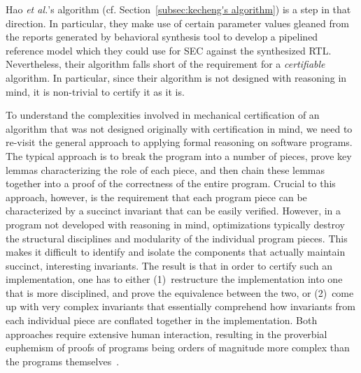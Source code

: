 Hao {\em et al.}'s algorithm
(cf. Section~\ref{subsec:kecheng's algorithm}) is a step in
that direction. In particular, they make use of certain
parameter values gleaned from the reports generated by
behavioral synthesis tool to develop a pipelined reference
model which they could use for SEC against the synthesized
RTL. Nevertheless, their algorithm falls short of the
requirement for a {\em certifiable} algorithm.  In
particular, since their algorithm is not designed with
reasoning in mind, it is non-trivial to certify it as it is.

To understand the complexities involved in mechanical
certification of an algorithm that was not designed
originally with certification in mind, we need to re-visit
the general approach to applying formal reasoning on
software programs.  The typical approach is to break the
program into a number of pieces, prove key lemmas
characterizing the role of each piece, and then chain these
lemmas together into a proof of the correctness of the
entire program. Crucial to this approach, however, is the
requirement that each program piece can be characterized by
a succinct invariant that can be easily verified.  However,
in a program not developed with reasoning in mind,
optimizations typically destroy the structural disciplines
and modularity of the individual program pieces. This makes it
difficult to identify and isolate the components that
actually maintain succinct, interesting invariants.  The
result is that in order to certify such an implementation,
one has to either (1)~restructure the implementation into
one that is more disciplined, and prove the equivalence
between the two, or (2)~come up with very complex
invariants that essentially comprehend how invariants from
each individual piece are conflated together in the
implementation.  Both approaches require extensive human
interaction, resulting in the proverbial euphemism of proofs
of programs being orders of magnitude more complex than the
programs themselves~\cite{liu}.


